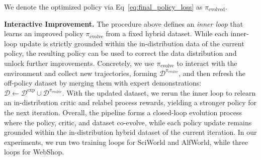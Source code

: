 \documentclass{article}
\theoremstyle{plain}
\theoremstyle{definition}
\theoremstyle{remark}
\begin{document}
% 
% 
We denote the optimized policy via Eq~\ref{eq:final_policy_loss} as $\pi_{\text{evolved}}$.

\textbf{Interactive Improvement.}
The procedure above defines an \emph{inner loop} that learns an improved policy $\pi_{\text{evolve}}$ from a fixed hybrid dataset.
While each inner-loop update is strictly grounded within the in-distribution data of the current policy, the resulting policy can be used to correct the data distribution and unlock further improvements.
Concretely, we use $\pi_{\text{evolve}}$ to interact with the environment and collect new trajectories, forming $\mathcal{D}^{\pi_{\text{evolve}}}$, and then refresh the off-policy dataset by merging them with expert demonstrations:
$\mathcal{D} \leftarrow \mathcal{D}^{\text{exp}} \cup \mathcal{D}^{\pi_{\text{evolve}}}$.
With the updated dataset, we rerun the inner loop to relearn an in-distribution critic and relabel process rewards, yielding a stronger policy for the next iteration. 
Overall, the pipeline forms a closed-loop evolution process where the policy, critic, and dataset co-evolve, while each policy update remains grounded within the in-distribution hybrid dataset of the current iteration.
In our experiments, we run two training loops for SciWorld and AlfWorld, while three loops for WebShop.
\end{document}
